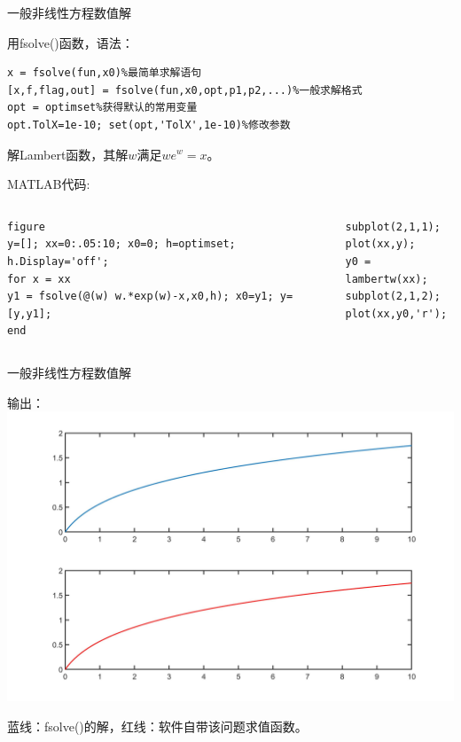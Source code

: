 \documentclass[10pt]{beamer}
\begin{document}
		\begin{frame}[fragile]{一般非线性方程数值解}
	\begin{block}{用fsolve()函数，语法：}
\begin{lstlisting}
x = fsolve(fun,x0)%最简单求解语句
[x,f,flag,out] = fsolve(fun,x0,opt,p1,p2,...)%一般求解格式
opt = optimset%获得默认的常用变量
opt.TolX=1e-10; set(opt,'TolX',1e-10)%修改参数
\end{lstlisting}
	\end{block}	  

	\begin{example}[6-8]
解Lambert函数，其解$w$满足$we^{w} = x$。
	\end{example}

	\begin{block}{MATLAB代码:}
		\begin{columns}[T]
\begin{lstlisting}
figure
y=[]; xx=0:.05:10; x0=0; h=optimset; h.Display='off';
for x = xx
y1 = fsolve(@(w) w.*exp(w)-x,x0,h); x0=y1; y=[y,y1];
end
\end{lstlisting}

\begin{lstlisting}
subplot(2,1,1);
plot(xx,y);
y0 = lambertw(xx);
subplot(2,1,2);
plot(xx,y0,'r');
\end{lstlisting}
		\end{columns}
	\end{block}
\end{frame}
\begin{frame}[fragile]{一般非线性方程数值解}
	\begin{block}{输出：}
		\centering
		\includegraphics[width=.7\textwidth]{13}
		
		{\color{cyan}蓝线}：fsolve()的解，{\color{red}红线}：软件自带该问题求值函数。
	\end{block}		
\end{frame}
\end{document}
